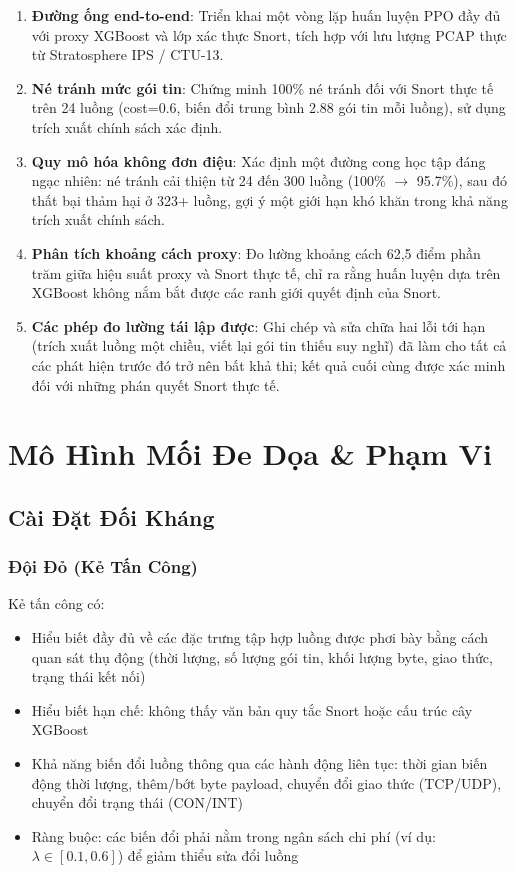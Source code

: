 \documentclass[12pt,a4paper]{report}
\begin{document}
\begin{enumerate}
  \item \textbf{Đường ống end-to-end}: Triển khai một vòng lặp huấn luyện PPO đầy đủ với proxy XGBoost và lớp xác thực Snort, tích hợp với lưu lượng PCAP thực từ Stratosphere IPS / CTU-13.
  
  \item \textbf{Né tránh mức gói tin}: Chứng minh 100\% né tránh đối với Snort thực tế trên 24 luồng (cost=0.6, biến đổi trung bình 2.88 gói tin mỗi luồng), sử dụng trích xuất chính sách xác định.
  
  \item \textbf{Quy mô hóa không đơn điệu}: Xác định một đường cong học tập đáng ngạc nhiên: né tránh cải thiện từ 24 đến 300 luồng (100\% $\to$ 95.7\%), sau đó thất bại thảm hại ở 323+ luồng, gợi ý một giới hạn khó khăn trong khả năng trích xuất chính sách.
  
  \item \textbf{Phân tích khoảng cách proxy}: Đo lường khoảng cách 62,5 điểm phần trăm giữa hiệu suất proxy và Snort thực tế, chỉ ra rằng huấn luyện dựa trên XGBoost không nắm bắt được các ranh giới quyết định của Snort.
  
  \item \textbf{Các phép đo lường tái lập được}: Ghi chép và sửa chữa hai lỗi tới hạn (trích xuất luồng một chiều, viết lại gói tin thiếu suy nghĩ) đã làm cho tất cả các phát hiện trước đó trở nên bất khả thi; kết quả cuối cùng được xác minh đối với những phán quyết Snort thực tế.
\end{enumerate}

\chapter{Mô Hình Mối Đe Dọa \& Phạm Vi}

\section{Cài Đặt Đối Kháng}

\subsection{Đội Đỏ (Kẻ Tấn Công)}
Kẻ tấn công có:
\begin{itemize}
  \item Hiểu biết đầy đủ về các đặc trưng tập hợp luồng được phơi bày bằng cách quan sát thụ động (thời lượng, số lượng gói tin, khối lượng byte, giao thức, trạng thái kết nối)
  \item Hiểu biết hạn chế: không thấy văn bản quy tắc Snort hoặc cấu trúc cây XGBoost
  \item Khả năng biến đổi luồng thông qua các hành động liên tục: thời gian biến động thời lượng, thêm/bớt byte payload, chuyển đổi giao thức (TCP/UDP), chuyển đổi trạng thái (CON/INT)
  \item Ràng buộc: các biến đổi phải nằm trong ngân sách chi phí (ví dụ: $\lambda \in [0.1, 0.6]$) để giảm thiểu sửa đổi luồng
\end{itemize}
\end{document}
